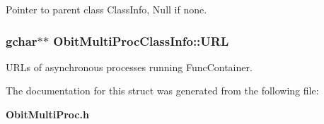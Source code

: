 Pointer to parent class Class\-Info, Null if none. 

\subsubsection{\setlength{\rightskip}{0pt plus 5cm}gchar$\ast$$\ast$ {\bf Obit\-Multi\-Proc\-Class\-Info::URL}}\label{structObitMultiProcClassInfo_o18}


URLs of asynchronous processes running Func\-Container. 



The documentation for this struct was generated from the following file:\begin{CompactItemize}
\item 
{\bf Obit\-Multi\-Proc.h}\end{CompactItemize}
